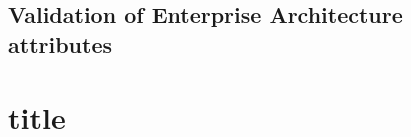 \subsection{Validation of Enterprise Architecture attributes}
\label{sub:validationofenterprisearchitectureattributes}




\section{title}

